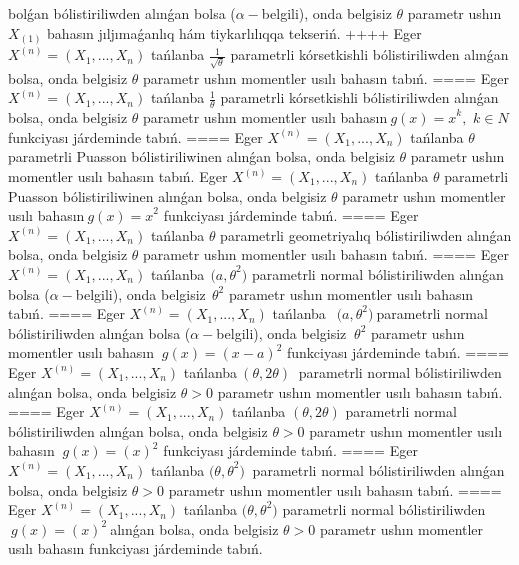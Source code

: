 bolǵan bólistiriliwden alınǵan bolsa (\(\alpha -\)belgili), onda belgisiz \(\theta\) parametr ushın \(X_{(1)}\) bahasın jıljımaǵanlıq hám tiykarlılıqqa tekseriń.
++++
Eger \(X^{(n)} = \left( X_{1},...,X_{n} \right)\) tańlanba \(\frac{1}{\sqrt{\theta}}\) parametrli kórsetkishli bólistiriliwden alınǵan bolsa, onda belgisiz \(\theta\) parametr ushın momentler usılı bahasın tabıń.
====
Eger \(X^{(n)} = \left( X_{1},...,X_{n} \right)\) tańlanba \(\frac{1}{\theta}\) parametrli kórsetkishli bólistiriliwden alınǵan bolsa, onda belgisiz \(\theta\) parametr ushın momentler usılı bahasın\({\ g(x) = x}^{k},\) \(k \in N\)funkciyası járdeminde tabıń.
====
Eger \(X^{(n)} = \left( X_{1},...,X_{n} \right)\) tańlanba \(\theta\) parametrli Puasson bólistiriliwinen alınǵan bolsa, onda belgisiz \(\theta\) parametr ushın momentler usılı bahasın tabıń. Eger \(X^{(n)} = \left( X_{1},...,X_{n} \right)\) tańlanba \(\theta\) parametrli Puasson bólistiriliwinen alınǵan bolsa, onda belgisiz \(\theta\) parametr ushın momentler usılı bahasın\({\ g(x) = x}^{2}\) funkciyası járdeminde tabıń.
====
Eger \(X^{(n)} = \left( X_{1},...,X_{n} \right)\) tańlanba \(\theta\) parametrli geometriyalıq bólistiriliwden alınǵan bolsa, onda belgisiz \(\theta\) parametr ushın momentler usılı bahasın tabıń.
====
Eger \(X^{(n)} = \left( X_{1},...,X_{n} \right)\) tańlanba\({\ \ (a,\theta}^{2})\) parametrli normal bólistiriliwden alınǵan bolsa (\(\alpha -\)belgili), onda belgisiz\({\ \ \theta}^{2}\) parametr ushın momentler usılı bahasın tabıń.
====
Eger \(X^{(n)} = \left( X_{1},...,X_{n} \right)\) tańlanba \({\ \ (a,\theta}^{2})\ \)parametrli normal bólistiriliwden alınǵan bolsa (\(\alpha -\)belgili), onda belgisiz \({\ \theta}^{2}\) parametr ushın momentler usılı bahasın \({\ g(x) = (x - a)}^{2}\) funkciyası járdeminde tabıń.
====
Eger \(X^{(n)} = \left( X_{1},...,X_{n} \right)\) tańlanba\(\ (\theta,2\theta)\ \) parametrli normal bólistiriliwden alınǵan bolsa, onda belgisiz \(\theta > 0\) parametr ushın momentler usılı bahasın tabıń.
====
Eger \(X^{(n)} = \left( X_{1},...,X_{n} \right)\) tańlanba \((\theta,2\theta)\) parametrli normal bólistiriliwden alınǵan bolsa, onda belgisiz \(\theta > 0\) parametr ushın momentler usılı bahasın \({\ g(x) = (x)}^{2}\) funkciyası járdeminde tabıń.
====
Eger \(X^{(n)} = \left( X_{1},...,X_{n} \right)\) tańlanba \({(\theta,\theta}^{2})\ \) parametrli normal bólistiriliwden alınǵan bolsa, onda belgisiz \(\theta > 0\) parametr ushın momentler usılı bahasın tabıń.
====
Eger \(X^{(n)} = \left( X_{1},...,X_{n} \right)\) tańlanba \({(\theta,\theta}^{2})\) parametrli normal bólistiriliwden \({\ g(x) = (x)}^{2}\ \)alınǵan bolsa, onda belgisiz \(\theta > 0\) parametr ushın momentler usılı bahasın funkciyası járdeminde tabıń.
